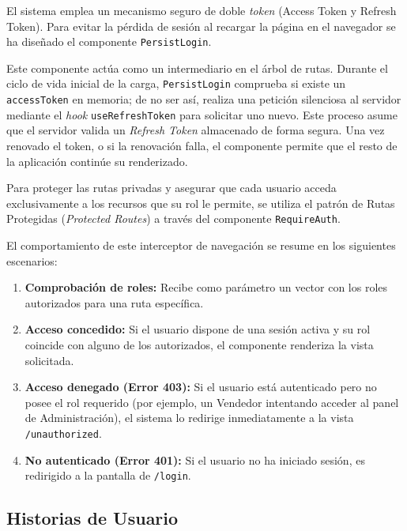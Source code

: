\documentclass[11pt]{article}
\begin{document}
      El sistema emplea un mecanismo seguro de doble \textit{token} (Access Token y
      Refresh Token). Para evitar la pérdida de sesión al recargar la página en el
      navegador se ha diseñado el componente \texttt{PersistLogin}.

      Este componente actúa como un intermediario en el árbol de rutas. Durante el
      ciclo de vida inicial de la carga, \texttt{PersistLogin} comprueba si existe un
      \texttt{accessToken} en memoria; de no ser así, realiza una petición silenciosa
      al servidor mediante el \textit{hook} \texttt{useRefreshToken} para solicitar
      uno nuevo. Este proceso asume que el servidor valida un \textit{Refresh Token}
      almacenado de forma segura. Una vez renovado el token, o si la renovación
      falla, el componente permite que el resto de la aplicación continúe su
      renderizado.

      Para proteger las rutas privadas y asegurar que cada usuario acceda
      exclusivamente a los recursos que su rol le permite, se utiliza el patrón de
      Rutas Protegidas (\textit{Protected Routes}) a través del componente
      \texttt{RequireAuth}.

      El comportamiento de este interceptor de navegación se resume en los siguientes
      escenarios:
      \begin{enumerate}
          \item \textbf{Comprobación de roles:} Recibe como parámetro un vector con los roles autorizados para una ruta específica.
          \item \textbf{Acceso concedido:} Si el usuario dispone de una sesión activa y su rol coincide con alguno de los autorizados, el componente renderiza la vista solicitada.
          \item \textbf{Acceso denegado (Error 403):} Si el usuario está autenticado pero no posee el rol requerido (por ejemplo, un Vendedor intentando acceder al panel de Administración), el sistema lo redirige inmediatamente a la vista \texttt{/unauthorized}.
          \item \textbf{No autenticado (Error 401):} Si el usuario no ha iniciado sesión, es redirigido a la pantalla de \texttt{/login}.
      \end{enumerate}

  \subsection{Historias de Usuario}
\end{document}
